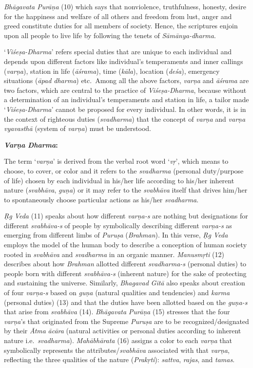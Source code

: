 \emph{Bhāgavata Purāṇa} (10) which says that nonviolence, truthfulness, honesty, desire for the happiness and welfare of all others and freedom from lust, anger and greed constitute duties for all members of society. Hence, the scriptures enjoin upon all people to live life by following the tenets of \emph{Sāmānya-dharma}.


`\emph{Viśeṣa-Dharma}' refers special duties that are unique to each individual and depends upon different factors like individual's temperaments and inner callings (\emph{varṇa}), station in life (\emph{āśrama}), time (\emph{kāla}), location (\emph{deśa}), emergency situations (\emph{āpad dharma}) etc.\ Among all the above factors, \emph{varṇa} and \emph{āśrama} are two factors, which are central to the practice of \emph{Viśeṣa-Dharma}, because without a determination of an individual's temperaments and station in life, a tailor made `\emph{Viśeṣa-Dharma}' cannot be proposed for every individual. In other words, it is in the context of righteous duties (\emph{svadharma}) that the concept of \emph{varṇa} and \emph{varṇa} \emph{vyavasthā} (system of \emph{varṇa}) must be understood.
\vskip 3pt

\textbf{\emph{Varṇa} \emph{Dharma}:}

The term `\emph{varṇa}' is derived from the verbal root word `\emph{vṛ}', which means to choose, to cover, or color and it refers to the \emph{svadharma} (personal duty/purpose of life) chosen by each individual in his/her life according to his/her inherent nature (\emph{svabhāva}, \emph{guṇa}) or it may refer to the \emph{svabhāva} itself that drives him/her to spontaneously choose particular actions as his/her \emph{svadharma}.

\emph{Ṛg Veda} (11) speaks about how different \emph{varṇa-s} are nothing but designations for different \emph{svabhāva-s} of people by symbolically describing different \emph{varṇa-s} as emerging from different limbs of \emph{Puruṣa} (\emph{Brahman}). In this verse, \emph{Ṛg Veda} employs the model of the human body to describe a conception of human society rooted in \emph{svabhāva} and \emph{svadharma} in an organic manner. \emph{Manusmṛti} (12) describes about how \emph{Brahman} allotted different \emph{svadharma-s} (personal duties) to people born with different \emph{svabhāva-s} (inherent nature) for the sake of protecting and sustaining the universe. Similarly, \emph{Bhagavad} \emph{Gītā} also speaks about creation of four \emph{varṇa-s} based on \emph{guṇa} (natural qualities and tendencies) and \emph{karma} (personal duties) (13) and that the duties have been allotted based on the \emph{guṇa-s} that arise from \emph{svabhāva} (14). \emph{Bhāgavata} \emph{Purāṇa} (15) stresses that the four \emph{varṇa}'s that originated from the Supreme \emph{Puruṣa} are to be recognized/designated by their \emph{Ātma} \emph{ācāra} (natural activities or personal duties according to inherent nature i.e.\ \emph{svadharma}). \emph{Mahābhārata} (16) assigns a color to each \emph{varṇa} that symbolically represents the attributes/\emph{svabhāva} associated with that \emph{varṇa}, reflecting the three qualities of the nature (\emph{Prakṛti}): \emph{sattva}, \emph{rajas}, and \emph{tamas}.

